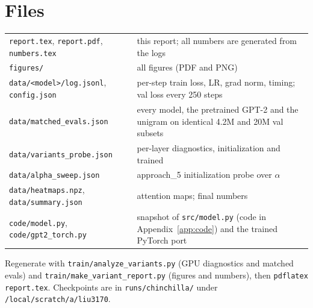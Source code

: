 \documentclass[11pt]{article}
\newcommand{\code}[1]{\texttt{#1}}
\begin{document}
\section*{Files}
{\small
\begin{tabularx}{\linewidth}{@{}lX@{}}
\code{report.tex}, \code{report.pdf}, \code{numbers.tex} & this report; all numbers are generated from the logs \\
\code{figures/} & all figures (PDF and PNG) \\
\code{data/<model>/log.jsonl}, \code{config.json} & per-step train loss, LR, grad norm, timing; val loss every 250 steps \\
\code{data/matched\_evals.json} & every model, the pretrained GPT-2 and the unigram on identical 4.2M and 20M val subsets \\
\code{data/variants\_probe.json} & per-layer diagnostics, initialization and trained \\
\code{data/alpha\_sweep.json} & approach\_5 initialization probe over $\alpha$ \\
\code{data/heatmaps.npz}, \code{data/summary.json} & attention maps; final numbers \\
\code{code/model.py}, \code{code/gpt2\_torch.py} & snapshot of \code{src/model.py} (code in Appendix~\ref{app:code}) and the trained PyTorch port \\
\end{tabularx}}

{\raggedright Regenerate with \code{train/analyze\_variants.py} (GPU diagnostics and matched evals) and
\code{train/make\_variant\_report.py} (figures and numbers), then \code{pdflatex report.tex}. Checkpoints are in
\code{runs/chinchilla/} under \code{/local/scratch/a/liu3170}.\par}


\end{document}
